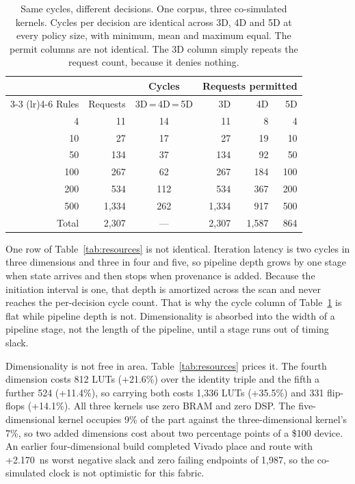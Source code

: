 \documentclass[conference]{IEEEtran}
\newcommand{\new}[1]{#1}
\begin{document}
\begin{table}[t]
\caption{\new{Same cycles, different decisions.} One corpus, three co-simulated kernels. Cycles per decision are identical across \new{3D, }4D and 5D at every policy size, with minimum, mean and maximum equal. \new{The permit columns are not identical. The 3D column simply repeats the request count, because it denies nothing.}}
\label{tab:cycles}
\centering
\footnotesize
\setlength{\tabcolsep}{4pt}
\begin{tabular}{rrcrrr}
\toprule
& & Cycles & \multicolumn{3}{c}{\new{Requests permitted}} \\
\cmidrule(lr){3-3} \cmidrule(lr){4-6}
Rules & Requests & 3D\,=\,4D\,=\,5D & \new{3D} & \new{4D} & \new{5D} \\
\midrule
4 & 11 & 14 & \new{11} & \new{8} & \new{4} \\
10 & 27 & 17 & \new{27} & \new{19} & \new{10} \\
50 & 134 & 37 & \new{134} & \new{92} & \new{50} \\
100 & 267 & 62 & \new{267} & \new{184} & \new{100} \\
200 & 534 & 112 & \new{534} & \new{367} & \new{200} \\
500 & 1{,}334 & 262 & \new{1{,}334} & \new{917} & \new{500} \\
\midrule
Total & 2{,}307 & --- & \new{2{,}307} & \new{1{,}587} & \new{864} \\
\bottomrule
\end{tabular}
\end{table}

\new{One row of Table~\ref{tab:resources} is not identical. Iteration latency is two cycles in three dimensions and three in four and five, so pipeline depth grows by one stage when state arrives and then stops when provenance is added. Because the initiation interval is one, that depth is amortized across the scan and never reaches the per-decision cycle count. That is why the cycle column of Table~\ref{tab:cycles} is flat while pipeline depth is not. Dimensionality is absorbed into the width of a pipeline stage, not the length of the pipeline, until a stage runs out of timing slack.}

\new{Dimensionality} is not free in area. Table~\ref{tab:resources} \new{prices it. The fourth dimension costs 812 LUTs (+21.6\%) over the identity triple and the fifth a further 524 (+11.4\%), so carrying both costs 1{,}336 LUTs (+35.5\%) and 331 flip-flops (+14.1\%). All three kernels use zero BRAM and zero DSP. The five-dimensional kernel occupies 9\% of the part against the three-dimensional kernel's 7\%, so two added dimensions cost about two percentage points of a \$100 device.} An earlier four-dimensional build completed Vivado place and route with +2.170~ns worst negative slack and zero failing endpoints of 1{,}987, so the co-simulated clock is not optimistic for this fabric.
\end{document}
